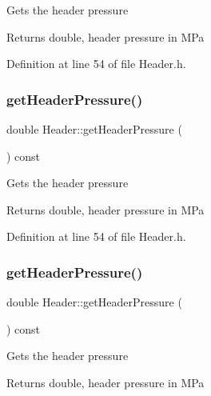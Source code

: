 Gets the header pressure \begin{DoxyReturn}{Returns}
double, header pressure in M\+Pa 
\end{DoxyReturn}


Definition at line 54 of file Header.\+h.

\mbox{\label{class_header_adc2e6daaf9f5e633c3db96ff3990f1f6}} 
\subsubsection{\texorpdfstring{get\+Header\+Pressure()}{getHeaderPressure()}\hspace{0.1cm}{\footnotesize\ttfamily [2/3]}}
{\footnotesize\ttfamily double Header\+::get\+Header\+Pressure (\begin{DoxyParamCaption}{ }\end{DoxyParamCaption}) const\hspace{0.3cm}{\ttfamily [inline]}}

Gets the header pressure \begin{DoxyReturn}{Returns}
double, header pressure in M\+Pa 
\end{DoxyReturn}


Definition at line 54 of file Header.\+h.

\mbox{\label{class_header_adc2e6daaf9f5e633c3db96ff3990f1f6}} 
\subsubsection{\texorpdfstring{get\+Header\+Pressure()}{getHeaderPressure()}\hspace{0.1cm}{\footnotesize\ttfamily [3/3]}}
{\footnotesize\ttfamily double Header\+::get\+Header\+Pressure (\begin{DoxyParamCaption}{ }\end{DoxyParamCaption}) const\hspace{0.3cm}{\ttfamily [inline]}}

Gets the header pressure \begin{DoxyReturn}{Returns}
double, header pressure in M\+Pa 
\end{DoxyReturn}


